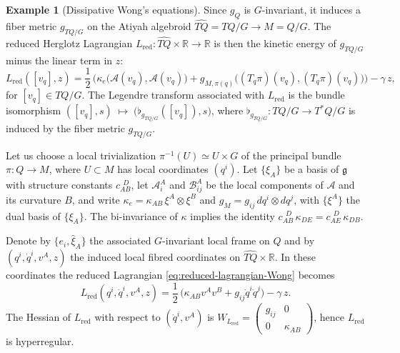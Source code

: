 \documentclass[11pt,a4paper]{article}
\theoremstyle{definition}
\newtheorem{example}[theorem]{Example}
\begin{document}
\begin{example}[Dissipative Wong's equations]
Since $g_Q$ is $G$-invariant, it induces a fiber metric $g_{TQ/G}$ on the
Atiyah algebroid $\widehat{TQ}=TQ/G\to M=Q/G$.  
The reduced Herglotz Lagrangian $L_{\mathrm{red}}\colon \widehat{TQ}\times\mathbb{R}\to\mathbb{R}$ is then the kinetic energy of $g_{TQ/G}$ minus the linear term in $z$:
\begin{equation}\label{eq:reduced-lagrangian-Wong}
L_{\mathrm{red}}([v_q],z)
= \frac{1}{2}\,\Big(
\kappa_e\big(\mathcal{A}(v_q),\mathcal{A}(v_q)\big)
+ g_{M,\pi(q)}\big((T_q\pi)(v_q),(T_q\pi)(v_q)\big)
\Big) - \gamma\,z,
\end{equation}
for $[v_q]\in TQ/G$. The Legendre transform associated with 
$L_{\mathrm{red}}$ is the bundle isomorphism $([v_q],s)\;\mapsto\;
\big(\flat_{g_{TQ/G}}([v_q]),s\big)$, where $\flat_{g_{TQ/G}}:TQ/G\to T^*Q/G$ is induced by the fiber metric $g_{TQ/G}$.

Let us choose a local trivialization $\pi^{-1}(U)\simeq U\times G$ of the
principal bundle $\pi:Q\to M$, where $U\subset M$ has local coordinates
$(q^i)$. Let $\{\xi_A\}$ be a basis of $\mathfrak{g}$ with structure
constants $c_{AB}^{\ \ D}$, let $\mathcal{A}_i^A$ and $\mathcal{B}_{ij}^A$
be the local components of $\mathcal{A}$ and its curvature $B$, and write $\kappa_e = \kappa_{AB}\,\xi^A\otimes\xi^B$ and $g_M = g_{ij}\,dq^i\otimes dq^j$, with $\{\xi^A\}$ the dual basis of $\{\xi_A\}$. The bi-invariance of $\kappa$
implies the identity $c_{AB}^{\ \ D}\,\kappa_{DE} = c_{AE}^{\ \ D}\,\kappa_{DB}$.

Denote by $\{e_i,\widehat{\xi}_A\}$ the associated $G$-invariant local frame
on $Q$ and by $(q^i,\dot q^i,v^A,z)$ the induced local fibred coordinates
on $\widehat{TQ}\times\mathbb{R}$. In these coordinates the reduced
Lagrangian \eqref{eq:reduced-lagrangian-Wong} becomes
\begin{equation}\label{eq:Wong-reduced-L}
L_{\mathrm{red}}(q^i,\dot q^i,v^A,z)
= \frac{1}{2}\,
\big(\kappa_{AB}v^A v^B + g_{ij}\dot q^i\dot q^j\big) - \gamma\,z.
\end{equation}
The Hessian of $L_{\mathrm{red}}$ with respect to $(\dot q^i,v^A)$ is $\displaystyle{W_{L_{\mathrm{red}}}
= \begin{pmatrix}
g_{ij} & 0\\[2pt]
0 & \kappa_{AB}
\end{pmatrix}}$, hence $L_{\mathrm{red}}$ is hyperregular.


\end{example}
\end{document}
